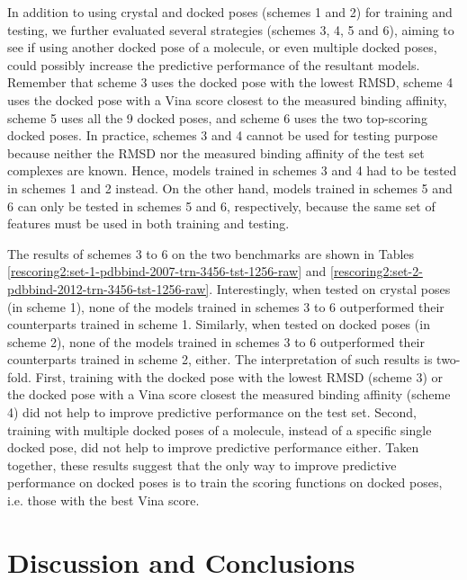 \documentclass[twocolumn]{bmcart}
\begin{document}
In addition to using crystal and docked poses (schemes 1 and 2) for training and testing, we further evaluated several strategies (schemes 3, 4, 5 and 6), aiming to see if using another docked pose of a molecule, or even multiple docked poses, could possibly increase the predictive performance of the resultant models. Remember that scheme 3 uses the docked pose with the lowest RMSD, scheme 4 uses the docked pose with a Vina score closest to the measured binding affinity, scheme 5 uses all the 9 docked poses, and scheme 6 uses the two top-scoring docked poses. In practice, schemes 3 and 4 cannot be used for testing purpose because neither the RMSD nor the measured binding affinity of the test set complexes are known. Hence, models trained in schemes 3 and 4 had to be tested in schemes 1 and 2 instead. On the other hand, models trained in schemes 5 and 6 can only be tested in schemes 5 and 6, respectively, because the same set of features must be used in both training and testing.

The results of schemes 3 to 6 on the two benchmarks are shown in Tables \ref{rescoring2:set-1-pdbbind-2007-trn-3456-tst-1256-raw} and \ref{rescoring2:set-2-pdbbind-2012-trn-3456-tst-1256-raw}. Interestingly, when tested on crystal poses (in scheme 1), none of the models trained in schemes 3 to 6 outperformed their counterparts trained in scheme 1. Similarly, when tested on docked poses (in scheme 2), none of the models trained in schemes 3 to 6 outperformed their counterparts trained in scheme 2, either. The interpretation of such results is two-fold. First, training with the docked pose with the lowest RMSD (scheme 3) or the docked pose with a Vina score closest the measured binding affinity (scheme 4) did not help to improve predictive performance on the test set. Second, training with multiple docked poses of a molecule, instead of a specific single docked pose, did not help to improve predictive performance either. Taken together, these results suggest that the only way to improve predictive performance on docked poses is to train the scoring functions on docked poses, i.e. those with the best Vina score.

\section*{Discussion and Conclusions}
\end{document}
